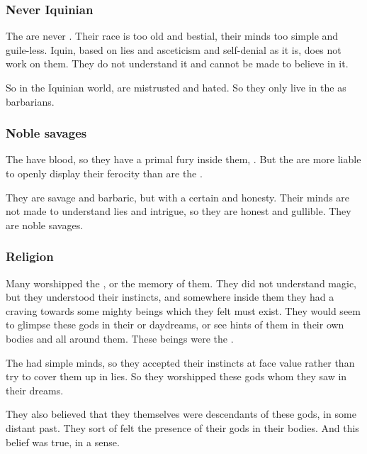 \subsubsection{Never Iquinian}
The \cregorrs{} are never . 
Their race is too old and bestial, their minds too simple and guile-less. 
Iquin, based on lies and asceticism and self-denial as it is, does not work on them. 
They do not understand it and cannot be made to believe in it. 

So in the Iquinian world, \cregorrs{} are mistrusted and hated. 
So they only live in the \wylde{} as barbarians. 





\subsubsection{Noble savages}
The \cregorrs{} have \xsic{} blood, so they have a primal fury inside them, . 
But the \cregorrs{} are more liable to openly display their ferocity than are the \scathae. 

They are savage and barbaric, but with a certain \naivete{} and honesty. 
Their minds are not made to understand lies and intrigue, so they are honest and gullible. 
They are noble savages. 





\subsubsection{Religion}
Many \cregorrs{} worshipped the \xss, or the memory of them. 
They did not understand magic, but they understood their instincts, and somewhere inside them they had a craving towards some mighty beings which they felt must exist. 
They would seem to glimpse these gods in their  or daydreams, or see hints of them in their own bodies and all around them. 
These beings were the \xss. 

The \cregorrs{} had simple minds, so they accepted their instincts at face value rather than try to cover them up in lies. 
So they worshipped these gods whom they saw in their dreams. 

They also believed that they themselves were descendants of these gods, in some distant past. 
They sort of felt the presence of their gods in their bodies. 
And this belief was true, in a sense. 

